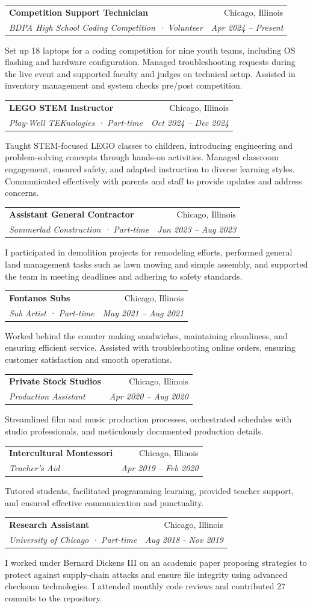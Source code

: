 \documentclass[letterpaper,11pt]{article}
\makeatletter
\newcommand{\resumeSubheading}[4]{
	\vspace{-2pt}\item
	\begin{tabular*}{0.97\textwidth}[t]{l@{\extracolsep{\fill}}r}
		\textbf{\small #1} & \small #2 \\
		\textit{\small #3} & \textit{\small #4} \\
	\end{tabular*}\vspace{-7pt}
}
\newcommand{\resumeParagraph}[1]{
  \item \small{#1}
}
\makeatother
\begin{document}
\resumeSubheading
{Competition Support Technician}{Chicago, Illinois}
{BDPA High School Coding Competition · Volunteer}{Apr 2024 – Present}
\resumeParagraph{
  Set up 18 laptops for a coding competition for nine youth teams, including OS flashing and hardware configuration. Managed troubleshooting requests during the live event and supported faculty and judges on technical setup. Assisted in inventory management and system checks pre/post competition.
}

\resumeSubheading
{LEGO STEM Instructor}{Chicago, Illinois}
{Play-Well TEKnologies · Part-time}{Oct 2024 – Dec 2024}
\resumeParagraph{Taught STEM-focused LEGO classes to children, introducing engineering and problem-solving concepts through hands-on activities. Managed classroom engagement, ensured safety, and adapted instruction to diverse learning styles. Communicated effectively with parents and staff to provide updates and address concerns.}

\resumeSubheading
{Assistant General Contractor}{Chicago, Illinois}
{Sommerlad Construction · Part-time}{Jun 2023 – Aug 2023}
\resumeParagraph{I participated in demolition projects for remodeling efforts, performed general land management tasks such as lawn mowing and simple assembly, and supported the team in meeting deadlines and adhering to safety standards.}

\resumeSubheading
{Fontanos Subs}{Chicago, Illinois}
{Sub Artist · Part-time}{May 2021 – Aug 2021}
\resumeParagraph{Worked behind the counter making sandwiches, maintaining cleanliness, and ensuring efficient service. Assisted with troubleshooting online orders, ensuring customer satisfaction and smooth operations.}

\resumeSubheading
{Private Stock Studios}{Chicago, Illinois}
{Production Assistant}{Apr 2020 – Aug 2020}
\resumeParagraph{Streamlined film and music production processes, orchestrated schedules with studio professionals, and meticulously documented production details.}

\resumeSubheading
{Intercultural Montessori}{Chicago, Illinois}
{Teacher’s Aid}{Apr 2019 – Feb 2020}
\resumeParagraph{Tutored students, facilitated programming learning, provided teacher support, and ensured effective communication and punctuality.}

\resumeSubheading
{Research Assistant}{Chicago, Illinois}
{University of Chicago · Part-time}{Aug 2018 - Nov 2019}
\resumeParagraph{I worked under Bernard Dickens III on an academic paper proposing strategies to protect against supply-chain attacks and ensure file integrity using advanced checksum technologies. I attended monthly code reviews and contributed 27 commits to the repository.}
\end{document}
